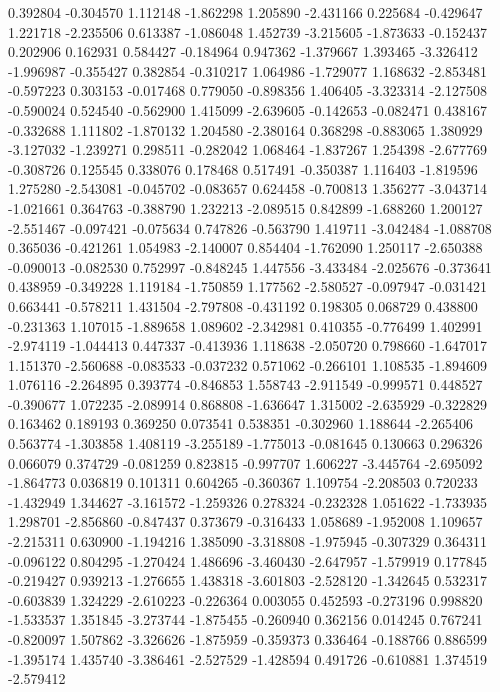 0.392804
-0.304570
1.112148
-1.862298
1.205890
-2.431166
0.225684
-0.429647
1.221718
-2.235506
0.613387
-1.086048
1.452739
-3.215605
-1.873633
-0.152437
0.202906
0.162931
0.584427
-0.184964
0.947362
-1.379667
1.393465
-3.326412
-1.996987
-0.355427
0.382854
-0.310217
1.064986
-1.729077
1.168632
-2.853481
-0.597223
0.303153
-0.017468
0.779050
-0.898356
1.406405
-3.323314
-2.127508
-0.590024
0.524540
-0.562900
1.415099
-2.639605
-0.142653
-0.082471
0.438167
-0.332688
1.111802
-1.870132
1.204580
-2.380164
0.368298
-0.883065
1.380929
-3.127032
-1.239271
0.298511
-0.282042
1.068464
-1.837267
1.254398
-2.677769
-0.308726
0.125545
0.338076
0.178468
0.517491
-0.350387
1.116403
-1.819596
1.275280
-2.543081
-0.045702
-0.083657
0.624458
-0.700813
1.356277
-3.043714
-1.021661
0.364763
-0.388790
1.232213
-2.089515
0.842899
-1.688260
1.200127
-2.551467
-0.097421
-0.075634
0.747826
-0.563790
1.419711
-3.042484
-1.088708
0.365036
-0.421261
1.054983
-2.140007
0.854404
-1.762090
1.250117
-2.650388
-0.090013
-0.082530
0.752997
-0.848245
1.447556
-3.433484
-2.025676
-0.373641
0.438959
-0.349228
1.119184
-1.750859
1.177562
-2.580527
-0.097947
-0.031421
0.663441
-0.578211
1.431504
-2.797808
-0.431192
0.198305
0.068729
0.438800
-0.231363
1.107015
-1.889658
1.089602
-2.342981
0.410355
-0.776499
1.402991
-2.974119
-1.044413
0.447337
-0.413936
1.118638
-2.050720
0.798660
-1.647017
1.151370
-2.560688
-0.083533
-0.037232
0.571062
-0.266101
1.108535
-1.894609
1.076116
-2.264895
0.393774
-0.846853
1.558743
-2.911549
-0.999571
0.448527
-0.390677
1.072235
-2.089914
0.868808
-1.636647
1.315002
-2.635929
-0.322829
0.163462
0.189193
0.369250
0.073541
0.538351
-0.302960
1.188644
-2.265406
0.563774
-1.303858
1.408119
-3.255189
-1.775013
-0.081645
0.130663
0.296326
0.066079
0.374729
-0.081259
0.823815
-0.997707
1.606227
-3.445764
-2.695092
-1.864773
0.036819
0.101311
0.604265
-0.360367
1.109754
-2.208503
0.720233
-1.432949
1.344627
-3.161572
-1.259326
0.278324
-0.232328
1.051622
-1.733935
1.298701
-2.856860
-0.847437
0.373679
-0.316433
1.058689
-1.952008
1.109657
-2.215311
0.630900
-1.194216
1.385090
-3.318808
-1.975945
-0.307329
0.364311
-0.096122
0.804295
-1.270424
1.486696
-3.460430
-2.647957
-1.579919
0.177845
-0.219427
0.939213
-1.276655
1.438318
-3.601803
-2.528120
-1.342645
0.532317
-0.603839
1.324229
-2.610223
-0.226364
0.003055
0.452593
-0.273196
0.998820
-1.533537
1.351845
-3.273744
-1.875455
-0.260940
0.362156
0.014245
0.767241
-0.820097
1.507862
-3.326626
-1.875959
-0.359373
0.336464
-0.188766
0.886599
-1.395174
1.435740
-3.386461
-2.527529
-1.428594
0.491726
-0.610881
1.374519
-2.579412
